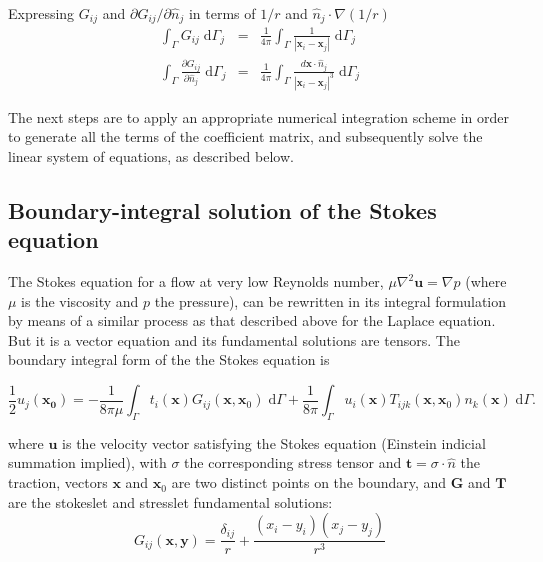 \documentclass[final,3p,times]{elsarticle}
\newcommand{\di}[1]{\text{d}#1}
\newcommand{\partiald}[2]{\frac{\partial #1}{\partial #2}}
\newcommand{\partialdi}[2]{\partial #1 / \partial #2}
\newcommand{\nhat}{\hat{n}}
\newcommand{\vect}[1]{\mathbf{#1}}
\begin{document}
Expressing $G_{ij}$ and $\partialdi{G_{ij}}{\nhat_j}$ in terms of $1/r$ and $\nhat_j\cdot\nabla(1/r)$
%
\begin{eqnarray}
	\label{eqn:laplace_bem_G}\int_{\Gamma} G_{ij}\;\di{\Gamma_j} & = & \frac{1}{4\pi}\int_{\Gamma} \frac{1}{|\vect{x}_i-\vect{x}_j|} \;\di{\Gamma_j} \\ 
	\label{eqn:laplace_bem_dGdn}\int_{\Gamma} \partiald{G_{ij}}{\nhat_j}\;\di{\Gamma_j} & = & \frac{1}{4\pi}\int_{\Gamma}\frac{d\vect{x}\cdot\nhat_j}{|\vect{x}_i-\vect{x}_j|^{3}}\;\di{\Gamma_j}
\end{eqnarray}

The next steps are to apply an appropriate numerical integration scheme in order to generate all the terms of the coefficient matrix, and subsequently solve the linear system of equations, as described below.

\subsection{Boundary-integral solution of the Stokes equation}

The Stokes equation for a flow at very low Reynolds number, $\mu\nabla^{2}\vect{u} =  \nabla p$ (where $\mu$ is the viscosity and $p$ the pressure), can be rewritten in its integral formulation by means of a similar process as that described above for the Laplace equation. But it is a vector equation and its fundamental solutions are tensors. The boundary integral form of the the Stokes equation is

\begin{equation}
	\label{eqn:stokes_bem_12}
	\frac{1}{2}u_j(\vect{x_0}) = -\frac{1}{8\pi\mu}\int_{\Gamma} t_i(\vect{x})G_{ij}(\vect{x},\vect{x}_0)\;\di{\Gamma} + \frac{1}{8\pi} \int_{\Gamma} u_i(\vect{x})T_{ijk}(\vect{x},\vect{x}_0)n_k(\vect{x})\;\di{\Gamma}.
\end{equation}

\noindent where $\vect{u}$ is the velocity vector satisfying the Stokes equation (Einstein indicial summation implied), with $\sigma$ the corresponding stress tensor and $\vect{t} = \sigma\cdot\nhat$  the traction, vectors $\vect{x}$ and $\vect{x}_0$ are two distinct points on the boundary, and $\vect{G}$ and $\vect{T}$ are the stokeslet and stresslet fundamental solutions:
%
\begin{equation}
	\label{eqn:stokeslet}
	G_{ij}(\vect{x},\vect{y})  =  \frac{\delta_{ij}}{r} + \frac{(x_i-y_i)(x_j-y_j)}{r^{3}} 
\end{equation}
\end{document}
